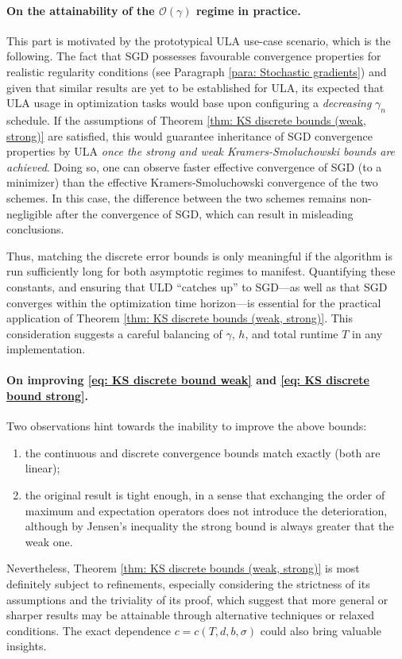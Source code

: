 \documentclass[12pt]{article}
\begin{document}
\paragraph{On the attainability of the $\mathcal{O}(\gamma)$ regime in practice.}
This part is motivated by the prototypical ULA use-case scenario, which is the following.
The fact that SGD possesses favourable convergence properties for realistic regularity conditions (see Paragraph \ref{para: Stochastic gradients}) and given that similar results are yet to be established for ULA, its expected that ULA usage in optimization tasks would base upon configuring a \emph{decreasing} $\gamma_n$ schedule.
If the assumptions of Theorem \ref{thm: KS discrete bounds (weak, strong)} are satisfied, this would guarantee inheritance of SGD convergence properties by ULA \emph{once the strong and weak Kramers-Smoluchowski bounds are achieved}.
Doing so, one can observe faster effective convergence of SGD (to a minimizer) than the effective Kramers-Smoluchowski convergence of the two schemes.
In this case, the difference between the two schemes remains non-negligible after the convergence of SGD, which can result in misleading conclusions.

Thus, matching the discrete error bounds is only meaningful if the algorithm is run sufficiently long for both asymptotic regimes to manifest.
Quantifying these constants, and ensuring that ULD ``catches up'' to SGD---as well as that SGD converges within the optimization time horizon---is essential for the practical application of Theorem \ref{thm: KS discrete bounds (weak, strong)}. This consideration suggests a careful balancing of $\gamma$, $h$, and total runtime $T$ in any implementation.

\paragraph{On improving \eqref{eq: KS discrete bound weak} and \eqref{eq: KS discrete bound strong}.}
Two observations hint towards the inability to improve the above bounds:
\begin{enumerate}
    \item the continuous and discrete convergence bounds match exactly (both are linear);
    \item the original result is tight enough, in a sense that exchanging the order of maximum and expectation operators does not introduce the deterioration, although by Jensen's inequality the strong bound is always greater that the weak one.
\end{enumerate}
Nevertheless, Theorem \ref{thm: KS discrete bounds (weak, strong)} is most definitely subject to refinements, especially considering the strictness of its assumptions and the triviality of its proof, which suggest that more general or sharper results may be attainable through alternative techniques or relaxed conditions.
The exact dependence $c=c(T, d, b, \sigma)$ could also bring valuable insights.
\end{document}
